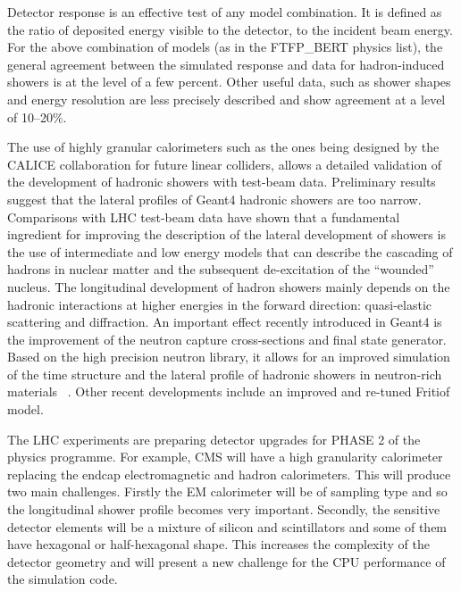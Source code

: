 \documentclass[12pt,a4paper]{article}
\begin{document}
Detector response is an effective test of any model combination. It is
defined as the ratio of deposited energy visible to the detector, to the
incident beam energy. For the above combination of models (as in the
FTFP\_BERT physics list), the general agreement between the simulated
response and data for hadron-induced showers is at the level of a few
percent. Other useful data, such as shower shapes and energy resolution
are less precisely described and show agreement at a level of 10--20\%.

The use of highly granular calorimeters such as the ones being designed
by the CALICE collaboration for future linear colliders, allows a
detailed validation of the development of hadronic showers with
test-beam data. Preliminary results suggest that the lateral profiles of
Geant4 hadronic showers are too narrow. Comparisons with LHC test-beam
data have shown that a fundamental ingredient for improving the
description of the lateral development of showers is the use of
intermediate and low energy models that can describe the cascading of
hadrons in nuclear matter and the subsequent de-excitation of the
``wounded'' nucleus. The longitudinal development of hadron showers
mainly depends on the hadronic interactions at higher energies in the
forward direction: quasi-elastic scattering and diffraction. An
important effect recently introduced in Geant4 is the improvement of the
neutron capture cross-sections and final state generator. Based on the
high precision neutron library, it allows for an improved simulation of
the time structure and the lateral profile of hadronic showers in
neutron-rich materials ~\cite{WERNER200881}. Other recent developments include an
improved and re-tuned Fritiof model.

The LHC experiments are preparing detector upgrades for PHASE 2 of the
physics programme. For example, CMS will have a high granularity
calorimeter replacing the endcap electromagnetic and hadron
calorimeters. This will produce two main challenges. Firstly the EM
calorimeter will be of sampling type and so the longitudinal shower
profile becomes very important. Secondly, the sensitive detector
elements will be a mixture of silicon and scintillators and some of them
have hexagonal or half-hexagonal shape. This increases the complexity of
the detector geometry and will present a new challenge for the CPU
performance of the simulation code.
\end{document}

